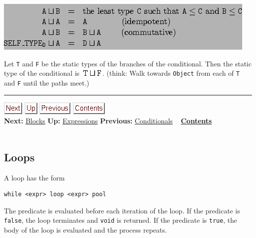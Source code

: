 \documentclass[]{article}
\begin{document}
\includegraphics{img23.png}

Let \texttt{T} and \texttt{F} be the static types of the branches of the
conditional. Then the static type of the conditional is
\includegraphics{img24.png}. (think: Walk towards \texttt{Object} from
each of \texttt{T} and \texttt{F} until the paths meet.)

\begin{center}\rule{3in}{0.4pt}\end{center}

\href{node20.html}{\includegraphics{next.png}}
\href{node13.html}{\includegraphics{up.png}}
\href{node18.html}{\includegraphics{prev.png}}
\href{node1.html}{\includegraphics{contents.png}} \\ \textbf{Next:}
\href{node20.html}{Blocks} \textbf{Up:} \href{node13.html}{Expressions}
\textbf{Previous:} \href{node18.html}{Conditionals} ~
\textbf{\href{node1.html}{Contents}} \\ \\

\subsection{Loops}

A loop has the form

\begin{verbatim}
while <expr> loop <expr> pool
\end{verbatim}

The predicate is evaluated before each iteration of the loop. If the
predicate is \texttt{false}, the loop terminates and \texttt{void} is
returned. If the predicate is \texttt{true}, the body of the loop is
evaluated and the process repeats.
\end{document}
